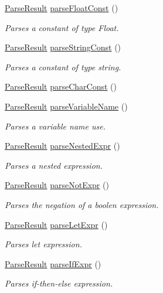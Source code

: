 \begin{DoxyCompactItemize}
\hyperlink{classParseResult}{Parse\-Result} \hyperlink{classParser_aaf7b1176fd53246f59577c7eec8b9d22}{parse\-Float\-Const} ()
\begin{DoxyCompactList}\small\item\em Parses a constant of type Float. \end{DoxyCompactList}\item 
\hyperlink{classParseResult}{Parse\-Result} \hyperlink{classParser_a4d8930d45c2b730912154c46cc54833c}{parse\-String\-Const} ()
\begin{DoxyCompactList}\small\item\em Parses a constant of type string. \end{DoxyCompactList}\item 
\hyperlink{classParseResult}{Parse\-Result} \hyperlink{classParser_a49c9b3d31ca060c97873e5485d518da3}{parse\-Char\-Const} ()
\item 
\hyperlink{classParseResult}{Parse\-Result} \hyperlink{classParser_a8c1baf62f71da64590e883e51ce622ca}{parse\-Variable\-Name} ()
\begin{DoxyCompactList}\small\item\em Parses a variable name use. \end{DoxyCompactList}\item 
\hyperlink{classParseResult}{Parse\-Result} \hyperlink{classParser_aec4c38e1e63c9becfd3a8fc4a1a73f01}{parse\-Nested\-Expr} ()
\begin{DoxyCompactList}\small\item\em Parses a nested expression. \end{DoxyCompactList}\item 
\hyperlink{classParseResult}{Parse\-Result} \hyperlink{classParser_a1503ceff46112d6d4f0e01b5fb77afcd}{parse\-Not\-Expr} ()
\begin{DoxyCompactList}\small\item\em Parses the negation of a boolen expression. \end{DoxyCompactList}\item 
\hyperlink{classParseResult}{Parse\-Result} \hyperlink{classParser_aa24c33b04779801b330d7fe5a74349e5}{parse\-Let\-Expr} ()
\begin{DoxyCompactList}\small\item\em Parses let expression. \end{DoxyCompactList}\item 
\hyperlink{classParseResult}{Parse\-Result} \hyperlink{classParser_a555bc6f671d408208e6d049f8e9f3c86}{parse\-If\-Expr} ()
\begin{DoxyCompactList}\small\item\em Parses if-\/then-\/else expression. \end{DoxyCompactList}\item 

\end{DoxyCompactItemize}
